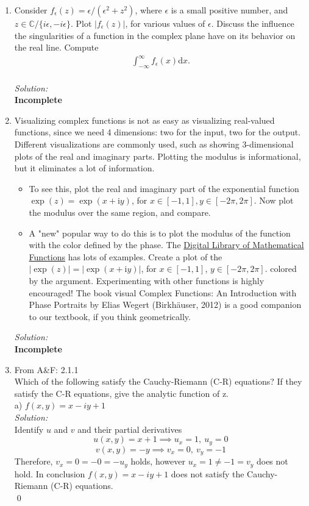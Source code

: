 \documentclass[10pt]{amsart}
\newcommand{\D}{\mathrm{d}}
\newcommand{\I}{\mathrm{i}}
\theoremstyle{nonumberplain}
\begin{document}
\begin{enumerate}[label={\bf {\arabic*}:}]
\item Consider $f_\epsilon(z)=\epsilon /\left(\epsilon^2+z^2\right)$, where
  $\epsilon$ is a small positive number, and $z \in \mathbb{C} /\{i
  \epsilon,-i \epsilon\}$. Plot $\left|f_\epsilon(z)\right|$, for various
  values of $\epsilon$. Discuss the influence the singularities of a
  function in the complex plane have on its behavior on the real
  line. Compute
  \begin{align*}
    \int_{-\infty}^\infty f_\epsilon(x) \D x.
  \end{align*}\\
\textit{Solution:} \\
\textbf{Incomplete} \\
\item Visualizing complex functions is not as easy as visualizing
  real-valued functions, since we need 4 dimensions: two for the input,
  two for the output. Different visualizations are commonly used, such
  as showing 3-dimensional plots of the real and imaginary
  parts. Plotting the modulus is informational, but it eliminates a
  lot of information.
  \begin{itemize}
\item To see this, plot the real and imaginary part of the exponential function $\exp (z)=\exp (x+\I y)$, for $x \in[-1,1], y \in[-2 \pi, 2 \pi]$. Now plot the modulus over the same region, and compare.
\item A "new" popular way to do this is to plot the modulus of the
function with the color defined by the phase. The \href{https://dlmf.nist.gov/}{Digital Library of
Mathematical Functions} has lots of examples. Create a plot of the
$|\exp (z)|=|\exp (x+\I y)|$, for $x \in[-1,1]$, $y \in[-2 \pi, 2
\pi]$. colored by the argument. Experimenting with other functions is
highly encouraged! The book visual Complex Functions: An Introduction
with Phase Portraits by Elias Wegert (Birkhäuser, 2012) is a good
companion to our textbook, if you think geometrically.
\end{itemize}
\textit{Solution:} \\
\textbf{Incomplete} \\
\item From A\&F: 2.1.1 \\
Which of the following satisfy the Cauchy-Riemann (C-R) equations? If they satisfy the C-R equations, give the analytic function of z. \\
a) $f(x, y) = x - iy + 1$ \\
\textit{Solution:} \\
Identify $u$ and $v$ and their partial derivatives
$$ u(x,y) = x + 1 \implies u_x = 1, \: u_y = 0$$
$$v(x,y) = - y \implies v_x = 0, \: v_y = -1$$
Therefore, $v_x = 0 = - 0 = - u_y$ holds, however $u_x = 1 \neq - 1 = v_y$ does not hold.
In conclusion $f(x, y) = x - iy + 1$ does not satisfy the Cauchy-Riemann (C-R) equations.\\
\qed


\end{enumerate}
\end{document}
